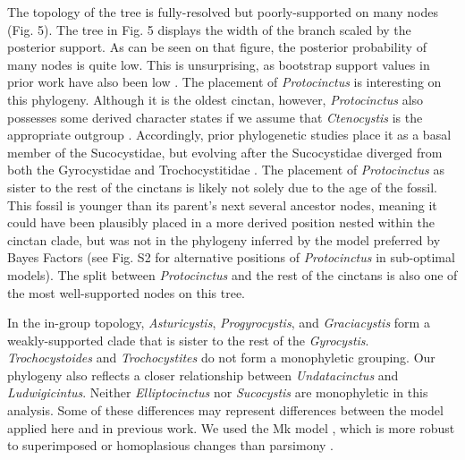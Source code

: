 \documentclass{article}
\begin{document}
The topology of the tree is fully-resolved but poorly-supported on many nodes (Fig. 5).
The tree in Fig. 5 displays the width of the branch scaled by the posterior support.
As can be seen on that figure, the posterior probability of many nodes is quite low. 
This is unsurprising, as bootstrap support values in prior work have also been low \citep{SmithZamora2009, ZamoraEtAl2013}.
The placement of \textit{Protocinctus} is interesting on this phylogeny. 
Although it is the oldest cinctan, however, \textit{Protocinctus} also possesses some derived character states if we assume that \textit{Ctenocystis} is the appropriate outgroup \citep{Rahman2009a}.  Accordingly, prior phylogenetic studies place it as a basal member of the Sucocystidae, but evolving after the Sucocystidae diverged from both the Gyrocystidae and Trochocystitidae \citep{SmithZamora2009, ZamoraRahmanSmith2013}. 
The placement of \textit{Protocinctus} as sister to the rest of the cinctans is likely not solely due to the age of the fossil. This fossil is younger than its parent's next several ancestor nodes, meaning it could have been plausibly placed in a more derived position nested within the cinctan clade, but was not in the phylogeny inferred by the model preferred by Bayes Factors (see Fig. S2 for alternative positions of \textit{Protocinctus} in sub-optimal models). 
The split between \textit{Protocinctus} and the rest of the cinctans is also one of the most well-supported nodes on this tree.

In the in-group topology, \textit{Asturicystis}, \textit{Progyrocystis}, and \textit{Graciacystis} form a weakly-supported clade that is sister to the rest of the \textit{Gyrocystis}.
\textit{Trochocystoides} and \textit{Trochocystites} do not form a monophyletic grouping. 
Our phylogeny also reflects a closer relationship between \textit{Undatacinctus} and \textit{Ludwigicintus}. 
Neither \textit{Elliptocinctus} nor \textit{Sucocystis} are monophyletic in this analysis.
Some of these differences may represent differences between the model applied here and in previous work.
We used the Mk model \citep{Lewis2001}, which is more robust to superimposed or homoplasious changes than parsimony \citep{Felsenstein1978, Wright2014}.
\end{document}
